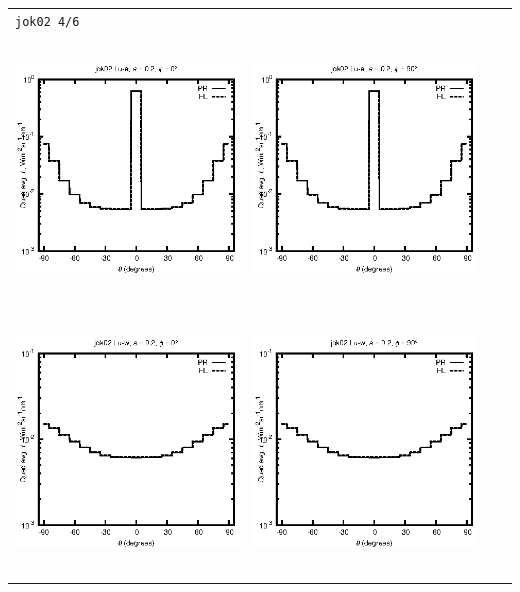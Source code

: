 \documentclass[10pt,a4paper]{article}
\begin{document}
\begin{adjustwidth}{-1.2in}{-1.2in}
\begin{tabular}{c c c c}
\multicolumn{4}{l}{\texttt{jok02 4/6}} \\
\includegraphics[height=7cm]{../eps/jok02_Lu_a_fwd.eps} &
\includegraphics[height=7cm]{../eps/jok02_Lu_a_cross.eps}\\
\includegraphics[height=7cm]{../eps/jok02_Lu_w_fwd.eps} &
\includegraphics[height=7cm]{../eps/jok02_Lu_w_cross.eps} \\

\end{tabular}
\end{adjustwidth}
\end{document}
